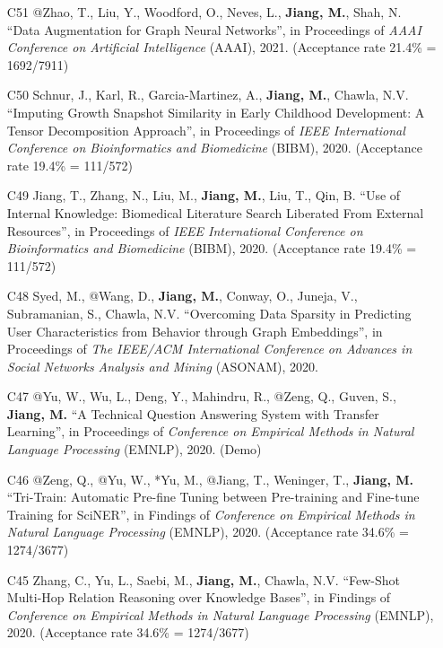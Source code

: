 \documentclass[10pt]{article}
\newenvironment{myindentpar}[1]%
{\begin{list}{}%
         {\setlength{\leftmargin}{#1}}%
         \item[]%
}
{\end{list}}
\newcounter{list}
\begin{document}
\begin{myindentpar}{0.00cm}
\begin{enumerate}[leftmargin=.5cm]
\item[C51] @Zhao, T., Liu, Y., Woodford, O., Neves, L., \textbf{Jiang, M.}, Shah, N. ``Data Augmentation for Graph Neural Networks'', in Proceedings of \textit{AAAI Conference on Artificial Intelligence} (AAAI), 2021. (Acceptance rate 21.4\% = 1692/7911)

\item[C50] Schnur, J., Karl, R., Garcia-Martinez, A., \textbf{Jiang, M.}, Chawla, N.V. ``Imputing Growth Snapshot Similarity in Early Childhood Development: A Tensor Decomposition Approach'', in Proceedings of \textit{IEEE International Conference on Bioinformatics and Biomedicine} (BIBM), 2020. (Acceptance rate 19.4\% = 111/572)

\item[C49] Jiang, T., Zhang, N., Liu, M., \textbf{Jiang, M.}, Liu, T., Qin, B. ``Use of Internal Knowledge: Biomedical Literature Search Liberated From External Resources'', in Proceedings of \textit{IEEE International Conference on Bioinformatics and Biomedicine} (BIBM), 2020. (Acceptance rate 19.4\% = 111/572)

\item[C48] Syed, M., @Wang, D., \textbf{Jiang, M.}, Conway, O., Juneja, V., Subramanian, S., Chawla, N.V. ``Overcoming Data Sparsity in Predicting User Characteristics from Behavior through Graph Embeddings'', in Proceedings of \textit{The IEEE/ACM International Conference on Advances in Social Networks Analysis and Mining} (ASONAM), 2020.

\item[C47] @Yu, W., Wu, L., Deng, Y., Mahindru, R., @Zeng, Q., Guven, S., \textbf{Jiang, M.} ``A Technical Question Answering System with Transfer Learning'', in Proceedings of \textit{Conference on Empirical Methods in Natural Language Processing} (EMNLP), 2020. (Demo)
		
\item[C46] @Zeng, Q., @Yu, W., *Yu, M., @Jiang, T., Weninger, T., \textbf{Jiang, M.} ``Tri-Train: Automatic Pre-fine Tuning between Pre-training and Fine-tune Training for SciNER'', in Findings of \textit{Conference on Empirical Methods in Natural Language Processing} (EMNLP), 2020. (Acceptance rate 34.6\% = 1274/3677)

\item[C45] Zhang, C., Yu, L., Saebi, M., \textbf{Jiang, M.}, Chawla, N.V. ``Few-Shot Multi-Hop Relation Reasoning over Knowledge Bases'', in Findings of \textit{Conference on Empirical Methods in Natural Language Processing} (EMNLP), 2020. (Acceptance rate 34.6\% = 1274/3677)


\end{enumerate}
\end{myindentpar}
\end{document}

